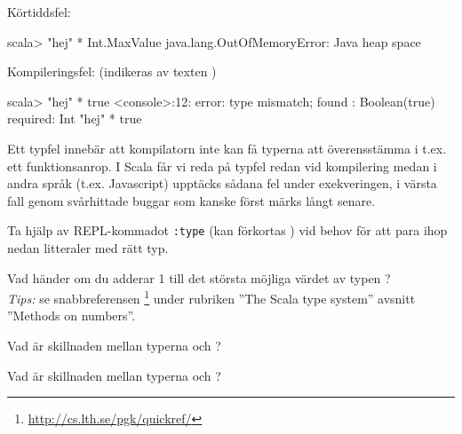 \SubtaskSolved Körtiddsfel:
\begin{REPLnonum}
scala> "hej" * Int.MaxValue
java.lang.OutOfMemoryError: Java heap space
\end{REPLnonum}

\SubtaskSolved Kompileringsfel: (indikeras av texten )
\begin{REPLnonum}
scala> "hej" * true
<console>:12: error: type mismatch;
 found   : Boolean(true)
 required: Int
       "hej" * true
\end{REPLnonum}
Ett typfel innebär att kompilatorn inte kan få typerna att överensstämma i t.ex. ett funktionsanrop. I Scala får vi reda på typfel redan vid kompilering medan i andra språk (t.ex. Javascript) upptäcks sådana fel under exekveringen, i värsta fall genom svårhittade buggar som kanske först märks långt senare.

\QUESTEND





\QUESTBEGIN

\Task \what

\Subtask Ta hjälp av REPL-kommadot \verb+:type+ (kan förkortas ) vid behov för att para ihop nedan litteraler med rätt typ.

\begin{ConceptConnections}[0.35\textwidth]

\end{ConceptConnections}

\Subtask Vad händer om du adderar 1 till det största möjliga värdet av typen ?
\\\emph{Tips:} se snabbreferensen \footnote{\url{http://cs.lth.se/pgk/quickref/}} under rubriken ''The Scala type system'' avsnitt ''Methods on numbers''.

\Subtask Vad är skillnaden mellan typerna  och ?

\Subtask Vad är skillnaden mellan typerna  och ?


\SOLUTION

